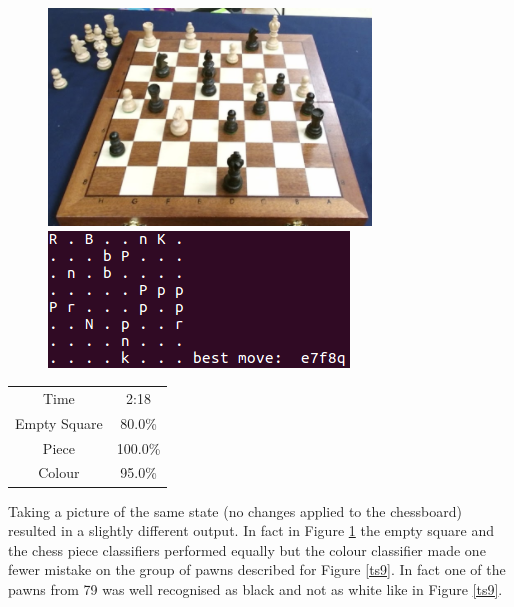 \documentclass{l4proj}
\begin{document}
\vspace{10mm}
\begin{figure}[h!]
\includegraphics[scale=0.8]{ts/ts10.png} \includegraphics[scale=0.75]{ts/tsd10.png}

\label{ts10}
\end{figure}

\begin{table}[h!]
\centering
\begin{tabular}{|c|c|}
	\hline
	Time & 2:18 \\
	\rowcolor{brown!45}Empty Square & 80.0\%  \\
	Piece & 100.0\% \\
	\rowcolor{brown!45} Colour & 95.0\% \\
	\hline
\end{tabular}
\end{table}

\vspace{10mm}
Taking a picture of the same state (no changes applied to the chessboard) resulted in a slightly different output. In fact in Figure \ref{ts10} the empty square and the chess piece classifiers performed equally but the colour classifier made one fewer mistake on the group of pawns described for Figure \ref{ts9}. In fact one of the pawns from 79 was well recognised as black and not as white like in Figure \ref{ts9}.
 
\end{document}
